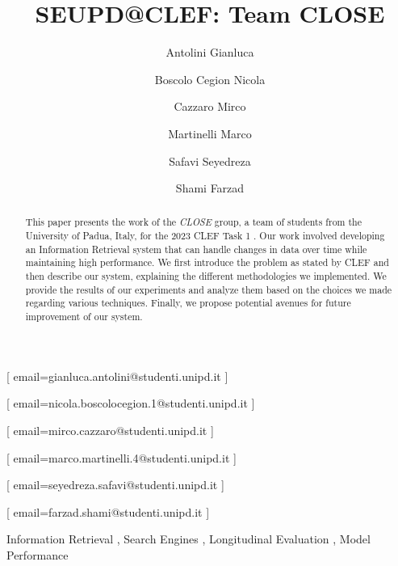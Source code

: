 \documentclass{ceurart}
\begin{document}


\title{SEUPD@CLEF: Team CLOSE}

\author[1]{Antolini Gianluca}[%
email=gianluca.antolini@studenti.unipd.it
]

\author[1]{Boscolo Cegion Nicola}[%
email=nicola.boscolocegion.1@studenti.unipd.it
]

\author[1]{Cazzaro Mirco}[%
email=mirco.cazzaro@studenti.unipd.it
]

\author[1]{Martinelli Marco}[%
email=marco.martinelli.4@studenti.unipd.it
]

\author[1]{Safavi Seyedreza}[%
email=seyedreza.safavi@studenti.unipd.it
]

\author[1]{Shami Farzad}[%
email=farzad.shami@studenti.unipd.it
]

\address[1]{University of Padua, Italy}


\begin{abstract}
  This paper presents the work of the \textit{CLOSE} group, a team of students from the University of Padua, Italy, for the 2023 \ac{CLEF} Task 1 \cite{cleflongeval}.
  Our work involved developing an Information Retrieval system that can handle changes in data over time while maintaining high performance.
  We first introduce the problem as stated by \ac{CLEF} and then describe our system, explaining the different methodologies we implemented.
  We provide the results of our experiments and analyze them based on the choices we made regarding various techniques.
  Finally, we propose potential avenues for future improvement of our system.
\end{abstract}

\begin{keywords}
  Information Retrieval \sep
  Search Engines \sep
  Longitudinal Evaluation \sep
  Model Performance
\end{keywords}
\end{document}
